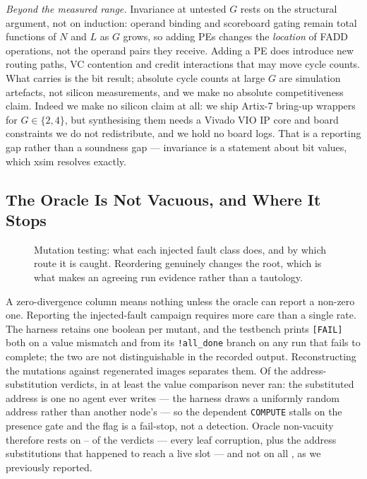 \documentclass[journal,10pt]{IEEEtran}
\theoremstyle{plain}
\theoremstyle{definition}
\theoremstyle{remark}
\newcommand{\sv}[1]{\texttt{#1}}
\begin{document}
\emph{Beyond the measured range.} Invariance at untested $G$ rests on the
structural argument, not on induction: operand binding and scoreboard gating
remain total functions of $N$ and $L$ as $G$ grows, so adding PEs changes the
\emph{location} of FADD operations, not the operand pairs they receive. Adding
a PE does introduce new routing paths, VC contention and credit interactions
that may move cycle counts. What carries is the bit result; absolute cycle
counts at large $G$ are simulation artefacts, not silicon measurements, and we
make no absolute competitiveness claim. Indeed we make no silicon claim at
all: we ship Artix-7 bring-up wrappers for $G \in \{2,4\}$, but synthesising
them needs a Vivado VIO IP core and board constraints we do not redistribute,
and we hold no board logs. That is a reporting gap rather than a soundness
gap --- invariance is a statement about bit values, which xsim resolves
exactly.

\subsection{The Oracle Is Not Vacuous, and Where It Stops}

\begin{figure}[!t]\centering

\caption{Mutation testing: what each injected fault class does, and by which route it is caught. Reordering genuinely changes the root, which is what makes an agreeing run evidence rather than a tautology.}\label{fig:mutation}
\end{figure}


A zero-divergence column means nothing unless the oracle can report a non-zero
one. Reporting the injected-fault campaign requires more care than a single
rate. The harness retains one boolean per mutant, and the testbench prints
\sv{[FAIL]} both on a value mismatch and from its \sv{!all\_done} branch on
any run that fails to complete; the two are not distinguishable in the
recorded output. Reconstructing the mutations against regenerated images
separates them. Of the \MutVerdicts{} address-substitution verdicts, in at
least \MutNoCompare{} the value comparison never ran: the substituted address
is one no agent ever writes --- the harness draws a uniformly random address
rather than another node's --- so the dependent \texttt{COMPUTE} stalls on the
presence gate and the flag is a fail-stop, not a detection. Oracle
non-vacuity therefore rests on \MutOracleLo{}--\MutOracleHi{} of the
\MutTotal{} verdicts --- every leaf corruption, plus the address substitutions
that happened to reach a live slot --- and not on all \MutTotal{}, as we
previously reported.
\end{document}

